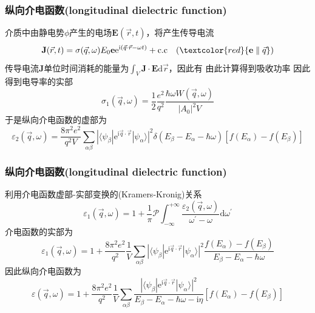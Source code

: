 \frame
{
	\frametitle{纵向介电函数\textrm{(longitudinal dielectric function)}}
	介质中由静电势$\phi$产生的电场$\mathbf{E}(\vec r,t)$，将产生传导电流
	\begin{displaymath}
		\mathbf{J}(\vec r,t)=\sigma(\vec q,\omega)E_0\mathbf{e}\mathrm{e}^{\mathrm{i}(\vec q\cdot\vec r-\omega t)}+\mathrm{c.c}\quad(\textcolor{red}{\mathbf{e}\parallel\vec q})
	\end{displaymath}
	传导电流$\mathbf{J}$单位时间消耗的能量为$\int_V\mathbf{J}\cdot\mathbf{E}\mathrm{d}\vec r$，因此有
由此计算得到吸收功率
{\fontsize{8.2pt}{6.2pt}}
因此得到电导率的实部
\begin{displaymath}
	\sigma_1(\vec q,\omega)=\frac12\frac{e^2}{q^2}\frac{\hbar\omega W(\vec q,\omega)}{|A_0|^2V}
\end{displaymath}
于是纵向介电函数的虚部为
\begin{displaymath}
	\varepsilon_2(\vec q,\omega)=\frac{8\pi^2e^2}{q^2V}\sum_{\alpha\beta}|\langle\psi_{\beta}|\mathrm{e}^{\mathrm{i}\vec q\cdot\vec r}|\psi_{\alpha}\rangle|^2\delta(E_{\beta}-E_{\alpha}-\hbar\omega)[f(E_{\alpha})-f(E_{\beta})]
\end{displaymath}
}

\frame
{
	\frametitle{纵向介电函数\textrm{(longitudinal dielectric function)}}
	利用介电函数虚部-实部变换的\textrm{(Kramers-Kronig)}关系
	\begin{displaymath}
		\varepsilon_1(\vec q,\omega)=1+\frac1{\pi}\mathscr{P}\int_{-\infty}^{+\infty}\frac{\varepsilon_2(\vec q,\omega)}{\omega^{\prime}-\omega}\mathrm{d}\omega^{\prime}
	\end{displaymath}
介电函数的实部为
\begin{displaymath}
	\varepsilon_1(\vec q,\omega)=1+\frac{8\pi^2e^2}{q^2}\frac1V\sum_{\alpha\beta}|\langle\psi_{\beta}|\mathrm{e}^{\mathrm{i}\vec q\cdot\vec r}|\psi_{\alpha}\rangle|^2\frac{f(E_{\alpha})-f(E_{\beta})}{E_{\beta}-E_{\alpha}-\hbar\omega}
\end{displaymath}
因此纵向介电函数为
	\begin{displaymath}
		\varepsilon(\vec q,\omega)=1+\frac{8\pi^2e^2}{q^2}\frac1V\sum_{\alpha\beta}\frac{|\langle\psi_{\beta}|\mathrm{e}^{\mathrm{i}\vec q\cdot\vec r}|\psi_{\alpha}\rangle|^2}{E_{\beta}-E_{\alpha}-\hbar\omega-\mathrm{i}\eta}[f(E_{\alpha})-f(E_{\beta})]
	\end{displaymath}
}

